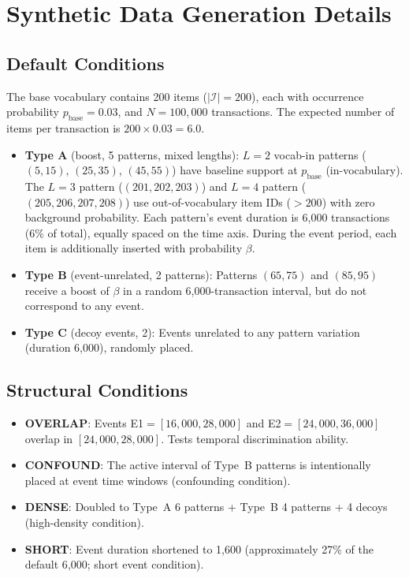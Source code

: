 \section{Synthetic Data Generation Details}\label{app:synthetic}

\subsection{Default Conditions}

The base vocabulary contains 200 items ($|\mathcal{I}| = 200$),
each with occurrence probability $p_{\text{base}} = 0.03$,
and $N = 100{,}000$ transactions.
The expected number of items per transaction is $200 \times 0.03 = 6.0$.

\begin{itemize}
\item \textbf{Type A} (boost, 5 patterns, mixed lengths):
    $L=2$ vocab-in patterns ($(5,15)$, $(25,35)$, $(45,55)$)
    have baseline support at $p_{\text{base}}$ (in-vocabulary).
    The $L=3$ pattern ($(201,202,203)$) and $L=4$ pattern ($(205,206,207,208)$)
    use out-of-vocabulary item IDs ($>200$) with zero background probability.
    Each pattern's event duration is 6{,}000 transactions (6\% of total),
    equally spaced on the time axis. During the event period,
    each item is additionally inserted with probability $\beta$.
\item \textbf{Type B} (event-unrelated, 2 patterns):
    Patterns $(65,75)$ and $(85,95)$ receive a boost of $\beta$
    in a random 6{,}000-transaction interval, but do not correspond to any event.
\item \textbf{Type C} (decoy events, 2):
    Events unrelated to any pattern variation (duration 6{,}000), randomly placed.
\end{itemize}

\subsection{Structural Conditions}

\begin{itemize}
\item \textbf{OVERLAP}: Events E1$=[16{,}000,28{,}000]$ and E2$=[24{,}000,36{,}000]$
    overlap in $[24{,}000,28{,}000]$. Tests temporal discrimination ability.
\item \textbf{CONFOUND}: The active interval of Type~B patterns is
    intentionally placed at event time windows (confounding condition).
\item \textbf{DENSE}: Doubled to Type~A 6 patterns + Type~B 4 patterns +
    4 decoys (high-density condition).
\item \textbf{SHORT}: Event duration shortened to 1{,}600
    (approximately 27\% of the default 6{,}000; short event condition).
\end{itemize}

